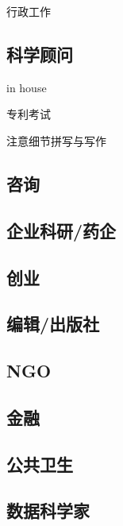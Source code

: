 \documentclass[]{tufte-book}
\begin{document}
行政工作

\hypertarget{ux79d1ux5b66ux987eux95ee}{%
\subsection{科学顾问}\label{ux79d1ux5b66ux987eux95ee}}

in house

专利考试

注意细节拼写与写作

\hypertarget{ux54a8ux8be2}{%
\subsection{咨询}\label{ux54a8ux8be2}}

\hypertarget{ux4f01ux4e1aux79d1ux7814ux836fux4f01}{%
\subsection{企业科研/药企}\label{ux4f01ux4e1aux79d1ux7814ux836fux4f01}}

\hypertarget{ux521bux4e1a}{%
\subsection{创业}\label{ux521bux4e1a}}

\hypertarget{ux7f16ux8f91ux51faux7248ux793e}{%
\subsection{编辑/出版社}\label{ux7f16ux8f91ux51faux7248ux793e}}

\hypertarget{ngo}{%
\subsection{NGO}\label{ngo}}

\hypertarget{ux91d1ux878d}{%
\subsection{金融}\label{ux91d1ux878d}}

\hypertarget{ux516cux5171ux536bux751f}{%
\subsection{公共卫生}\label{ux516cux5171ux536bux751f}}

\hypertarget{ux6570ux636eux79d1ux5b66ux5bb6}{%
\subsection{数据科学家}\label{ux6570ux636eux79d1ux5b66ux5bb6}}
\end{document}
